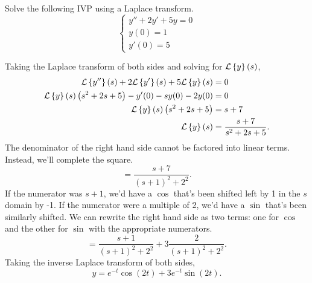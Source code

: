 \begin{example}
	Solve the following IVP using a Laplace transform.
	\begin{equation*}
		\begin{cases}
			y'' + 2y' + 5y = 0 \\
			y(0) = 1 \\
			y'(0) = 5
		\end{cases}
	\end{equation*}
\end{example}
\noindent
Taking the Laplace transform of both sides and solving for $\mathcal{L}\left\{ y \right\}\left(s\right)$,
\begin{align*}
	\mathcal{L}\left\{ y'' \right\}\left(s\right) + 2\mathcal{L}\left\{ y' \right\}\left(s\right) + 5\mathcal{L}\left\{ y \right\}\left(s\right) &= 0 \\
	\mathcal{L}\left\{ y \right\}\left(s\right)\left(s^2 + 2s + 5\right) - y'(0) - sy(0) - 2y(0) &= 0 \\
	\mathcal{L}\left\{ y \right\}\left(s\right)\left(s^2 + 2s + 5\right) &= s + 7 \\
	\mathcal{L}\left\{ y \right\}\left(s\right) &= \frac{s + 7}{s^2 + 2s + 5}.
\end{align*}
The denominator of the right hand side cannot be factored into linear terms.
Instead, we'll complete the square.
\begin{equation*}
	= \frac{s + 7}{(s+1)^2 + 2^2}.
\end{equation*}
If the numerator was $s+1$, we'd have a $\cos$ that's been shifted left by 1 in the $s$ domain by -1.
If the numerator were a multiple of 2, we'd have a $\sin$ that's been similarly shifted.
We can rewrite the right hand side as two terms: one for $\cos$ and the other for $\sin$ with the appropriate numerators.
\begin{equation*}
	= \frac{s+1}{(s+1)^2 + 2^2} + 3\frac{2}{(s+1)^2 + 2^2}.
\end{equation*}
Taking the inverse Laplace transform of both sides,
\begin{equation*}
	y = e^{-t}\cos{(2t)} + 3e^{-t}\sin{(2t)}.
\end{equation*}

